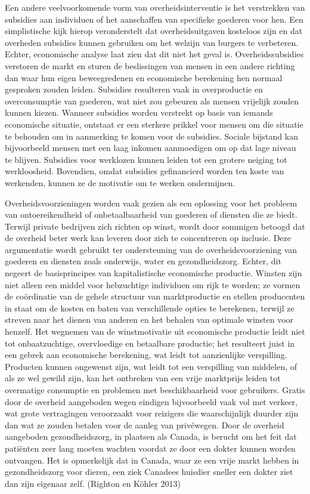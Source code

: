 \documentclass[
  a5paper,
  smalldemyvopaper,11pt,twoside,onecolumn,openright,extrafontsizes,
hidelinks]{memoir}
\begin{document}
Een andere veelvoorkomende vorm van overheidsinterventie is het
verstrekken van subsidies aan individuen of het aanschaffen van
specifieke goederen voor hen. Een simplistische kijk hierop
veronderstelt dat overheidsuitgaven kosteloos zijn en dat overheden
subsidies kunnen gebruiken om het welzijn van burgers te verbeteren.
Echter, economische analyse laat zien dat dit niet het geval is.
Overheidssubsidies verstoren de markt en sturen de beslissingen van
mensen in een andere richting dan waar hun eigen beweegredenen en
economische berekening hen normaal gesproken zouden leiden. Subsidies
resulteren vaak in overproductie en overconsumptie van goederen, wat
niet zou gebeuren als mensen vrijelijk zouden kunnen kiezen. Wanneer
subsidies worden verstrekt op basis van iemands economische situatie,
ontstaat er een sterkere prikkel voor mensen om die situatie te behouden
om in aanmerking te komen voor de subsidies. Sociale bijstand kan
bijvoorbeeld mensen met een laag inkomen aanmoedigen om op dat lage
niveau te blijven. Subsidies voor werklozen kunnen leiden tot een
grotere neiging tot werkloosheid. Bovendien, omdat subsidies
gefinancierd worden ten koste van werkenden, kunnen ze de motivatie om
te werken ondermijnen.

Overheidsvoorzieningen worden vaak gezien als een oplossing voor het
probleem van ontoereikendheid of onbetaalbaarheid van goederen of
diensten die ze biedt. Terwijl private bedrijven zich richten op winst,
wordt door sommigen betoogd dat de overheid beter werk kan leveren door
zich te concentreren op inclusie. Deze argumentatie wordt gebruikt ter
ondersteuning van de overheidsvoorziening van goederen en diensten zoals
onderwijs, water en gezondheidszorg. Echter, dit negeert de
basisprincipes van kapitalistische economische productie. Winsten zijn
niet alleen een middel voor hebzuchtige individuen om rijk te worden; ze
vormen de coördinatie van de gehele structuur van marktproductie en
stellen producenten in staat om de kosten en baten van verschillende
opties te berekenen, terwijl ze streven naar het dienen van anderen en
het behalen van optimale winsten voor henzelf. Het wegnemen van de
winstmotivatie uit economische productie leidt niet tot onbaatzuchtige,
overvloedige en betaalbare productie; het resulteert juist in een gebrek
aan economische berekening, wat leidt tot aanzienlijke verspilling.
Producten kunnen ongewenst zijn, wat leidt tot een verspilling van
middelen, of als ze wel gewild zijn, kan het ontbreken van een vrije
marktprijs leiden tot overmatige consumptie en problemen met
beschikbaarheid voor gebruikers. Gratis door de overheid aangeboden
wegen eindigen bijvoorbeeld vaak vol met verkeer, wat grote vertragingen
veroorzaakt voor reizigers die waarschijnlijk duurder zijn dan wat ze
zouden betalen voor de aanleg van privéwegen. Door de overheid
aangeboden gezondheidszorg, in plaatsen als Canada, is berucht om het
feit dat patiënten zeer lang moeten wachten voordat ze door een dokter
kunnen worden ontvangen. Het is opmerkelijk dat in Canada, waar ze een
vrije markt hebben in gezondheidszorg voor dieren, een ziek Canadees
huisdier sneller een dokter ziet dan zijn eigenaar zelf. (Righton en
Köhler 2013)
\end{document}
